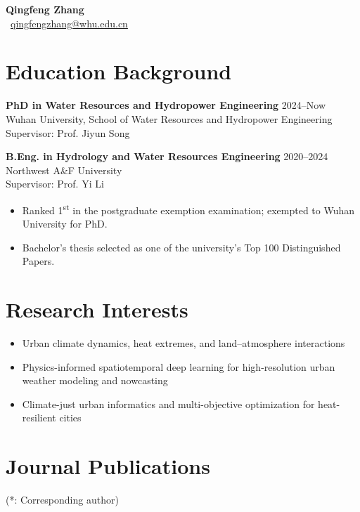 \documentclass[10pt,a4paper]{article}
\begin{document}
\begin{center}
    {\Huge\bfseries Qingfeng Zhang}\\[2pt]
    \faEnvelope\ \href{mailto:qingfengzhang@whu.edu.cn}{qingfengzhang@whu.edu.cn}
\end{center}

\section{Education Background}

\textbf{PhD in Water Resources and Hydropower Engineering} \hfill 2024--Now\\
Wuhan University, School of Water Resources and Hydropower Engineering\\
Supervisor: Prof. Jiyun Song

\textbf{B.Eng. in Hydrology and Water Resources Engineering} \hfill 2020--2024\\
Northwest A\&F University\\
Supervisor: Prof. Yi Li
\begin{itemize}[leftmargin=12pt,label=--]
    \item Ranked 1\textsuperscript{st} in the postgraduate exemption examination; exempted to Wuhan University for PhD.
    \item Bachelor's thesis selected as one of the university's Top 100 Distinguished Papers.
\end{itemize}

\section{Research Interests}

\begin{itemize}[leftmargin=22pt]
    \item Urban climate dynamics, heat extremes, and land--atmosphere interactions
    \item Physics-informed spatiotemporal deep learning for high-resolution urban weather modeling and nowcasting
    \item Climate-just urban informatics and multi-objective optimization for heat-resilient cities
\end{itemize}

\section{Journal Publications}
{\small (*: Corresponding author)}
\end{document}
